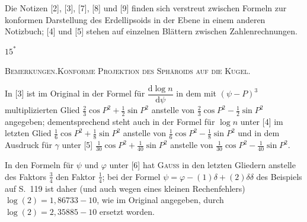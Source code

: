 Die Notizen [2], [3], [7], [8] und [9] finden sich verstreut zwischen Formeln zur konformen Darstellung des Erdellipsoids in der Ebene in einem anderen Notizbuch; [4] und [5] stehen auf einzelnen Blättern zwischen Zahlenrechnungen.
\par\endgroup
\vfill\hfill$15^*$\hspace*{2cm}\par
\clearpage
{}\hfill{\footnotesize\textsc{Bemerkungen.\quad Konforme Projektion des Sphäroids auf die Kugel.}}\par\medskip
\begingroup\small
In [3] ist im Original in der Formel für $\dfrac{\mathrm d\log n}{\mathrm d\psi}$ in dem mit $(\psi-P)^3$ multiplizierten Glied $\tfrac23\cos P^2+\tfrac12\sin P^2$ anstelle von $\tfrac23\cos P^2-\tfrac12\sin P^2$ angegeben; dementsprechend steht auch in der Formel für $\log n$ unter [4] im letzten Glied $\tfrac16\cos P^2+\tfrac18\sin P^2$ anstelle von $\tfrac16\cos P^2-\tfrac18\sin P^2$ und in dem Ausdruck für $\gamma$ unter [5] $\tfrac1{30}\cos P^2+\tfrac1{40}\sin P^2$ anstelle von $\tfrac1{30}\cos P^2-\tfrac1{40}\sin P^2$.

In den Formeln für $\psi$ und $\varphi$ unter [6] hat \textsc{Gauss} in den letzten Gliedern anstelle des Faktors $\tfrac34$ den Faktor $\tfrac14$; bei der Formel $\psi=\varphi-(1)\delta+(2)\delta\delta$ des Beispiels auf S.~119 ist daher (und auch wegen eines kleinen Rechenfehlers) $\log(2)=1{,}86733-10$, wie im Original angegeben, durch $\log(2)=2{,}35885-10$ ersetzt worden.

